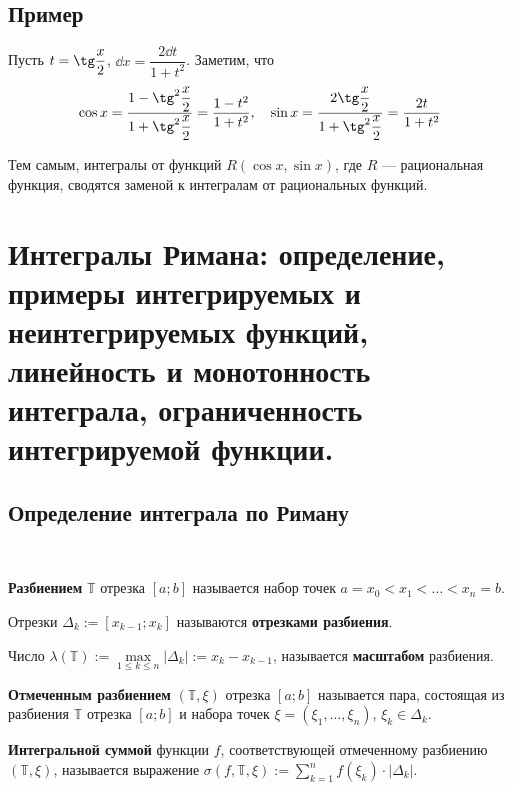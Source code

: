 \documentclass[a4paper]{article}
\theoremstyle{named}
\newcommand{\T}{\mathbb{T}}
\begin{document}
        \subsection{Пример}

        \begin{example*}
            Пусть $t = \tg \dfrac{x}{2}$, $\dd x = \dfrac{2 \dd t}{1 + t^2}$. Заметим, что
            \begin{equation*}
                \cos x = \dfrac{1 - \tg^2 \dfrac{x}{2}}{1 + \tg^2 \dfrac{x}{2}} = \dfrac{1 - t^2}{1 + t^2}, \quad
                \sin x = \dfrac{2 \tg \dfrac{x}{2}}{1 + \tg^2 \dfrac{x}{2}} = \dfrac{2t}{1 + t^2}
            \end{equation*}

            Тем самым, интегралы от функций $R(\cos x, \sin x)$, где $R$ --- рациональная функция, сводятся заменой к интегралам от рациональных функций.
        \end{example*}

    \section{Интегралы Римана: определение, примеры интегрируемых и неинтегрируемых функций, линейность и монотонность интеграла, ограниченность интегрируемой функции.}

        \subsection{Определение интеграла по Риману}

        \begin{definition*}~

            \textbf{Разбиением} $\T$ отрезка $[a; b]$ называется набор точек $a = x_0 < x_1 < \dots < x_n = b$.

            Отрезки $\Delta_k := [x_{k - 1}; x_k]$ называются \textbf{отрезками разбиения}.

            Число $\lambda(\T) := \max\limits_{1 \leq k \leq n} |\Delta_k| := x_k - x_{k - 1}$, называется \textbf{масштабом} разбиения.

            \textbf{Отмеченным разбиением} $(\T, \xi)$ отрезка $[a; b]$ называется пара, состоящая из разбиения $\T$ отрезка $[a; b]$ и набора точек $\xi = (\xi_1, \dots, \xi_n)$, $\xi_k \in \Delta_k$.

            \textbf{Интегральной суммой} функции $f$, соответствующей отмеченному разбиению $(\T, \xi)$, называется выражение $\sigma(f, \T, \xi) := \sum_{k = 1}^n f(\xi_k) \cdot |\Delta_k|$.
        \end{definition*}
\end{document}
